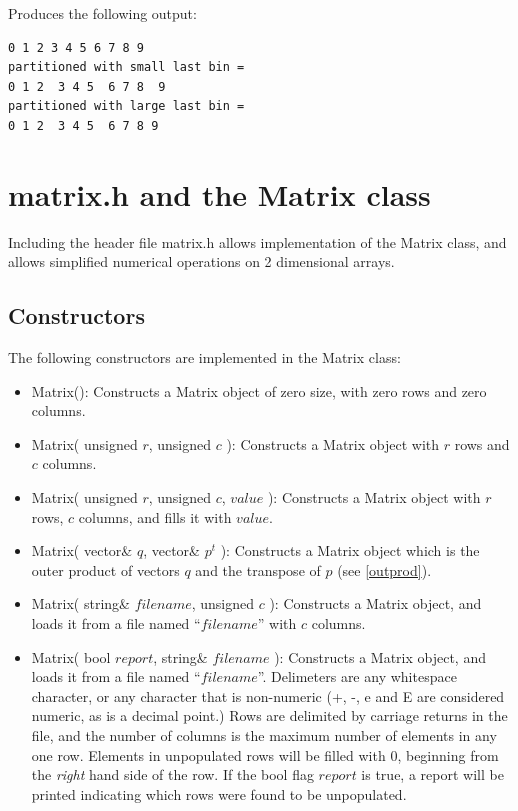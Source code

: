 \documentclass{report}
\begin{document}
Produces the following output:

\begin{verbatim}
0 1 2 3 4 5 6 7 8 9
partitioned with small last bin =
0 1 2  3 4 5  6 7 8  9
partitioned with large last bin =
0 1 2  3 4 5  6 7 8 9
\end{verbatim}

\section{matrix.h and the Matrix class}

Including the header file matrix.h allows implementation of the Matrix
class, and allows simplified numerical operations on 2 dimensional
arrays.

\subsection{Constructors}

The following constructors are implemented in the Matrix class:
\begin{itemize}
\item Matrix(): Constructs a Matrix object of zero size, with zero
      rows and zero columns.
\item Matrix( unsigned $r$, unsigned $c$ ): Constructs a Matrix
      object with $r$ rows and $c$ columns.
\item Matrix( unsigned $r$, unsigned $c$, $value$ ): Constructs a
Matrix
      object with $r$ rows, $c$ columns, and fills it with
      $value$.
\item Matrix( vector\& $q$, vector\& $p^t$ ): Constructs a Matrix
      object which is the outer product of vectors $q$ and the
      transpose of $p$ (see \ref{outprod}).
\item Matrix( string\& $filename$, unsigned $c$ ): Constructs a Matrix
      object, and loads it from a file named ``$filename$'' with $c$
      columns.
\item Matrix( bool $report$, string\& $filename$ ): Constructs a
      Matrix object, and loads it from a file named ``$filename$''.
      Delimeters are any whitespace character, or any character that
      is non-numeric (+, -, e and E are considered numeric, as is a
      decimal point.)  Rows are delimited by carriage returns in the
      file, and the number of columns is the maximum number of
      elements in any one row.  Elements in unpopulated rows will be
      filled with 0, beginning from the {\em right} hand side of the
      row.  If the bool flag $report$ is true, a report will be
      printed indicating which rows were found to be unpopulated.
\end{itemize}
\end{document}
